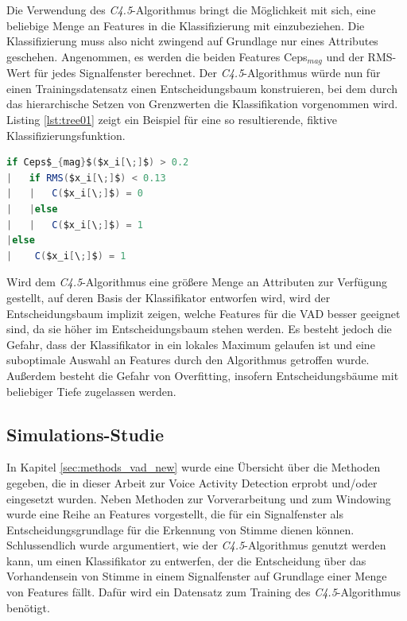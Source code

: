 Die Verwendung des \emph{C4.5}-Algorithmus bringt die Möglichkeit mit sich, eine beliebige Menge an Features in die Klassifizierung mit einzubeziehen. Die Klassifizierung muss also nicht zwingend auf Grundlage nur eines Attributes geschehen. Angenommen, es werden die beiden Features Ceps$_{mag}$ und der RMS-Wert für jedes Signalfenster berechnet. Der \emph{C4.5}-Algorithmus würde nun für einen Trainingsdatensatz einen Entscheidungsbaum konstruieren, bei dem durch das hierarchische Setzen von Grenzwerten die Klassifikation vorgenommen wird. Listing \ref{lst:tree01} zeigt ein Beispiel für eine so resultierende, fiktive Klassifizierungsfunktion.

\begin{lstlisting}[frame=single,mathescape=true,basicstyle=\footnotesize,language=Java,label=lst:tree01,caption=Beispiel eines CART-Entscheidungsbaums,linewidth=1\textwidth]
if Ceps$_{mag}$($x_i[\;]$) > 0.2
|   if RMS($x_i[\;]$) < 0.13
|   |   C($x_i[\;]$) = 0
|   |else
|   |   C($x_i[\;]$) = 1
|else
|    C($x_i[\;]$) = 1
\end{lstlisting}

Wird dem \emph{C4.5}-Algorithmus eine größere Menge an Attributen zur Verfügung gestellt, auf deren Basis der Klassifikator entworfen wird, wird der Entscheidungsbaum implizit zeigen, welche Features für die VAD besser geeignet sind, da sie höher im Entscheidungsbaum stehen werden. Es besteht jedoch die Gefahr, dass der Klassifikator in ein lokales Maximum gelaufen ist und eine suboptimale Auswahl an Features durch den Algorithmus getroffen wurde. Außerdem besteht die Gefahr von Overfitting, insofern Entscheidungsbäume mit beliebiger Tiefe zugelassen werden.

\subsection{Simulations-Studie}
\label{sec:vad_study}

In Kapitel \ref{sec:methods_vad_new} wurde eine Übersicht über die Methoden gegeben, die in dieser Arbeit zur Voice Activity Detection erprobt und/oder eingesetzt wurden. Neben Methoden zur Vorverarbeitung und zum Windowing wurde eine Reihe an Features vorgestellt, die für ein Signalfenster als Entscheidungsgrundlage für die Erkennung von Stimme dienen können. Schlussendlich wurde argumentiert, wie der \emph{C4.5}-Algorithmus genutzt werden kann, um einen Klassifikator zu entwerfen, der die Entscheidung über das Vorhandensein von Stimme in einem Signalfenster auf Grundlage einer Menge von Features fällt. Dafür wird ein Datensatz zum Training des \emph{C4.5}-Algorithmus benötigt.

